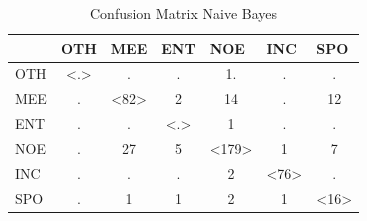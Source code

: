 \documentclass[
10pt, %
a4paper, %
oneside, %
headinclude,footinclude, %
BCOR5mm, %
]{scrartcl}
\begin{document}
\begin{table}[h]
\begin{tabular}{|l|c|c|c|c|c|c|}
\hline
    & \multicolumn{1}{l|}{OTH} & \multicolumn{1}{l|}{MEE} & \multicolumn{1}{l|}{ENT} & \multicolumn{1}{l|}{NOE} & \multicolumn{1}{l|}{INC} & \multicolumn{1}{l|}{SPO} \\ \hline
OTH & \textless.\textgreater   & .                        & .                        & 1.                       & .                        & .                        \\ \hline
MEE & .                        & \textless82\textgreater  & 2                        & 14                       & .                        & 12                       \\ \hline
ENT & .                        & .                        & \textless.\textgreater   & 1                        & .                        & .                        \\ \hline
NOE & .                        & 27                       & 5                        & \textless179\textgreater & 1                        & 7                        \\ \hline
INC & .                        & .                        & .                        & 2                        & \textless76\textgreater  & .                        \\ \hline
SPO & .                        & 1                        & 1                        & 2                        & 1                        & \textless16\textgreater  \\ \hline
\end{tabular}

\caption[Table caption text]{Confusion Matrix Naive Bayes }
\end{table}
\end{document}
